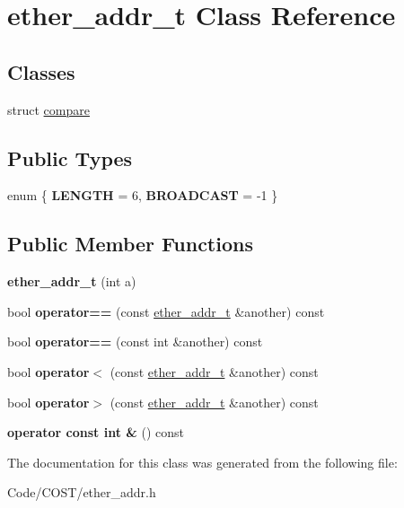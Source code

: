 \hypertarget{classether__addr__t}{}\section{ether\+\_\+addr\+\_\+t Class Reference}
\label{classether__addr__t}
\subsection*{Classes}
\begin{DoxyCompactItemize}
\item 
struct \hyperlink{structether__addr__t_1_1compare}{compare}
\end{DoxyCompactItemize}
\subsection*{Public Types}
\begin{DoxyCompactItemize}
\item 
\mbox{\label{classether__addr__t_aa1f92fa9aaa472425fb06fc435c724a5}} 
enum \{ {\bfseries L\+E\+N\+G\+TH} = 6, 
{\bfseries B\+R\+O\+A\+D\+C\+A\+ST} = -\/1
 \}
\end{DoxyCompactItemize}
\subsection*{Public Member Functions}
\begin{DoxyCompactItemize}
\item 
\mbox{\label{classether__addr__t_a41424c689ecf2696e0627d5445dc0c5c}} 
{\bfseries ether\+\_\+addr\+\_\+t} (int a)
\item 
\mbox{\label{classether__addr__t_affb772a413cdbb9c2aa71f6515f3f56e}} 
bool {\bfseries operator==} (const \hyperlink{classether__addr__t}{ether\+\_\+addr\+\_\+t} \&another) const
\item 
\mbox{\label{classether__addr__t_a2b34b5b11b24a222d6563d59bbd3c961}} 
bool {\bfseries operator==} (const int \&another) const
\item 
\mbox{\label{classether__addr__t_a345afc79d87f17db4552601c55e63a88}} 
bool {\bfseries operator$<$} (const \hyperlink{classether__addr__t}{ether\+\_\+addr\+\_\+t} \&another) const
\item 
\mbox{\label{classether__addr__t_a209a1dc197af9de026cc2829c63e6353}} 
bool {\bfseries operator$>$} (const \hyperlink{classether__addr__t}{ether\+\_\+addr\+\_\+t} \&another) const
\item 
\mbox{\label{classether__addr__t_afe80cdb317eb355327c9e36879896c50}} 
{\bfseries operator const int \&} () const
\end{DoxyCompactItemize}


The documentation for this class was generated from the following file\+:\begin{DoxyCompactItemize}
\item 
Code/\+C\+O\+S\+T/ether\+\_\+addr.\+h\end{DoxyCompactItemize}
